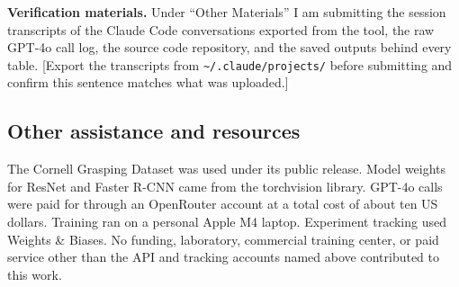 \textbf{Verification materials.} Under ``Other Materials'' I am
submitting the session transcripts of the Claude Code conversations
exported from the tool, the raw GPT-4o call log, the source code
repository, and the saved outputs behind every table. [Export the
transcripts from \texttt{\textasciitilde/.claude/projects/} before
submitting and confirm this sentence matches what was uploaded.]

\subsection*{Other assistance and resources}

The Cornell Grasping Dataset was used under its public release. Model
weights for ResNet and Faster R-CNN came from the torchvision library.
GPT-4o calls were paid for through an OpenRouter account at a total cost
of about ten US dollars. Training ran on a personal Apple M4 laptop.
Experiment tracking used Weights \& Biases. No funding, laboratory,
commercial training center, or paid service other than the API and
tracking accounts named above contributed to this work.
